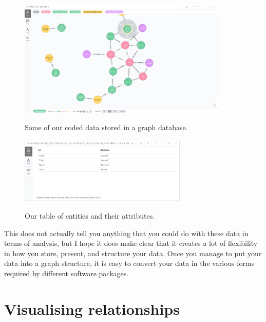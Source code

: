 \documentclass{memoir}
\begin{document}
\begin{figure}[h!]
  \centering
  \caption{Some of our coded data stored in a graph database.}
  \includegraphics[width=100mm]{Screenshot_23.pdf}
  \label{fig:graphdatabaseexample}
\end{figure}

\begin{figure}[h!]
  \centering
  \caption{Our table of entities and their attributes.}
  \includegraphics[width=80mm]{Screenshot_24.pdf}
  \label{fig:attributestable}
\end{figure}

This does not actually tell you anything that you could do with these data in terms of analysis, but I hope it does make clear that it creates a lot of flexibility in how you store, present, and structure your data. Once you manage to put your data into a graph structure, it is easy to convert your data in the various forms required by different software packages.

\section{Visualising relationships}
\label{sec:visualisingrelationships}
\end{document}
